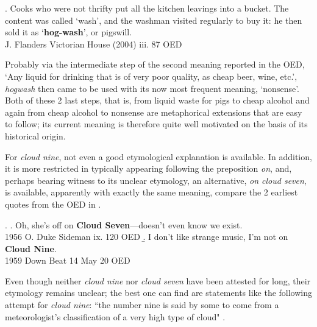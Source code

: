 \ex.    Cooks who were not
thrifty put all the kitchen leavings into a bucket. The content was called
‘wash’, and the washman visited regularly to buy it: he then sold it as
‘\textbf{hog-wash}’, or pigswill.\\
J. Flanders Victorian House (2004) iii. 87 OED

Probably via the intermediate step of the second meaning reported in the OED,
`Any liquid for drinking that is of very poor quality, as cheap beer, wine,
etc.', \emph{hogwash} then came to be used with its now most frequent meaning,
`nonsense'. Both of these 2 last steps, that is, from liquid waste for pigs
to cheap alcohol and again from cheap alcohol to nonsense are metaphorical
extensions that are easy to follow; its current meaning is therefore quite well motivated on the basis of its
historical origin.

For \emph{cloud nine}, not even a good etymological explanation is
available. In addition, it is more restricted in typically appearing following the preposition \emph{on}, and, perhaps bearing witness to its unclear etymology, an alternative, \emph{on cloud seven}, is available, apparently with exactly the same meaning, compare the 2 earliest quotes from the OED in \Next.

\ex. \a. Oh, she's off on \textbf{Cloud Seven}—doesn't even know we exist.\\1956   O. Duke Sideman ix. 120  OED
\b. I don't like strange music, I'm not on \textbf{Cloud Nine}.\\1959   Down Beat 14 May 20 OED

Even though neither \emph{cloud nine} nor \emph{cloud seven} have been
attested for long, their etymology remains unclear; the best one can
find are statements like the following attempt for \emph{cloud nine}:
``the number nine is said by some to come from a meteorologist’s
classification of a very high type of cloud" \citep{Walter:2014}.

